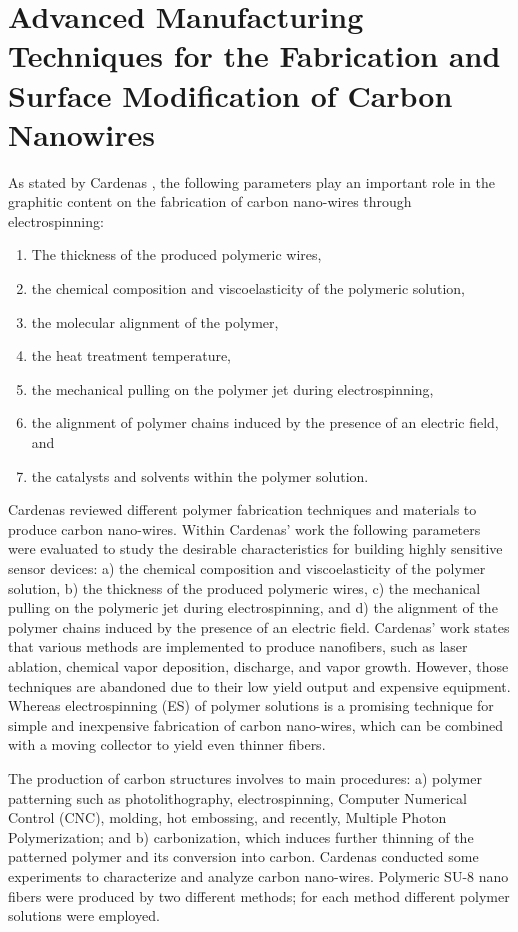 \clearpage

\section{Advanced Manufacturing Techniques for the Fabrication and Surface Modification of Carbon Nanowires \cite{Cardenas2017}}

As stated by Cardenas \cite{Cardenas2017}, the following parameters play an important role in the graphitic content on the fabrication of carbon nano-wires through electrospinning:

\begin{enumerate}
\item The thickness of the produced polymeric wires,
\item the chemical composition and viscoelasticity of the polymeric solution,
\item the molecular alignment of the polymer,
\item the heat treatment temperature,
\item the mechanical pulling on the polymer jet during electrospinning,
\item the alignment of polymer chains induced by the presence of an electric field, and
\item the catalysts and solvents within the polymer solution.
\end{enumerate}

Cardenas reviewed different polymer fabrication techniques and materials to produce carbon nano-wires. Within Cardenas' work the following parameters were evaluated to study the desirable characteristics for building highly sensitive sensor devices: a) the chemical composition and viscoelasticity of the polymer solution, b) the thickness of the produced polymeric wires, c) the mechanical pulling on the polymeric jet during electrospinning, and d) the alignment of the polymer chains induced by the presence of an electric field. Cardenas' work states that various methods are implemented to produce nanofibers, such as laser ablation, chemical vapor deposition, discharge, and vapor growth. However, those techniques are abandoned due to their low yield output and expensive equipment. Whereas electrospinning (ES) of polymer solutions is a promising technique for simple and inexpensive fabrication of carbon nano-wires, which can be combined with a moving collector to yield even thinner fibers.

The production of carbon structures involves to main procedures: a) polymer patterning such as photolithography, electrospinning, Computer Numerical Control (CNC), molding, hot embossing, and recently, Multiple Photon Polymerization; and b) carbonization, which induces further thinning of the patterned polymer and its conversion into carbon. Cardenas conducted some experiments to characterize and analyze carbon nano-wires. Polymeric SU-8 nano fibers were produced by two different methods; for each method different polymer solutions were employed.

